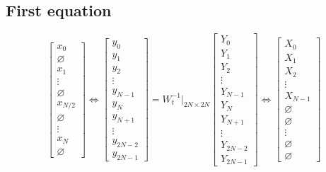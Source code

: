 \documentclass[12pt]{article}
\begin{document}
\subsection{First equation}
\begin{equation}
    \begin{bmatrix}
        x_0 \\ \varnothing \\ x_1 \\ \vdots \\ \varnothing \\ x_{N/2} \\ \varnothing \\ \vdots \\ x_N \\ \varnothing
    \end{bmatrix}
\Leftrightarrow
    \begin{bmatrix}
        y_0 \\ y_1 \\ y_2 \\ \vdots \\ y_{N-1} \\ y_N \\ y_{N+1} \\ \vdots \\ y_{2N-2} \\ y_{2N-1}
    \end{bmatrix}
= W_t^{-1}|_{2N\times 2N}
    \begin{bmatrix}
        Y_0 \\ Y_1 \\ Y_2 \\ \vdots \\ Y_{N-1} \\Y_N \\ Y_{N+1} \\ \vdots \\ Y_{2N-2} \\ Y_{2N-1} 
    \end{bmatrix}
\Leftrightarrow
    \begin{bmatrix}
        X_0 \\ X_1  \\ X_2 \\ \vdots \\ X_{N-1} \\ \varnothing \\ \varnothing \\ \vdots \\ \varnothing \\ \varnothing
    \end{bmatrix}
\end{equation}
\end{document}
